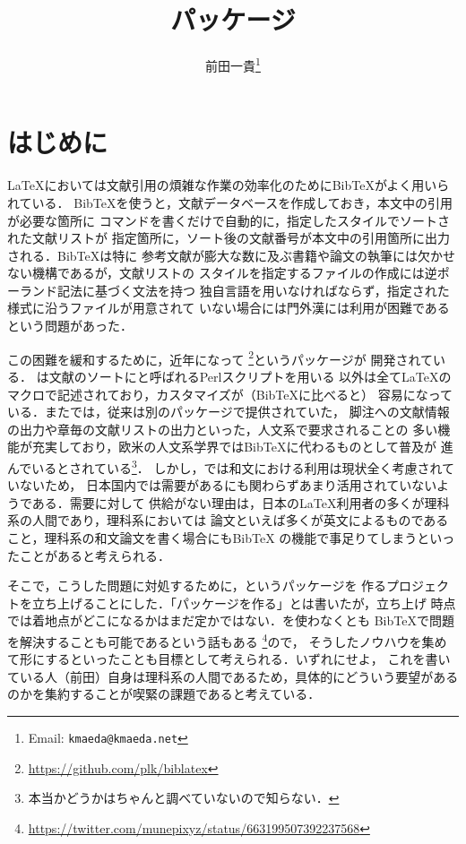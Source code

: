 \documentclass[lualatex,ja=standard,magstyle=real]{bxjsarticle}
\title{\bfseries\spotcolor\sty{biblatex-japanese}パッケージ}
\author{前田一貴\footnote{Email: \texttt{kmaeda@kmaeda.net}}}
\begin{document}
\maketitle

\tableofcontents

\section{はじめに}
\LaTeX においては文献引用の煩雑な作業の効率化のためにBib\TeX がよく用いられている．
Bib\TeX を使うと，文献データベースを作成しておき，本文中の引用が必要な箇所に
コマンドを書くだけで自動的に，指定したスタイルでソートされた文献リストが
指定箇所に，ソート後の文献番号が本文中の引用箇所に出力される．Bib\TeX は特に
参考文献が膨大な数に及ぶ書籍や論文の執筆には欠かせない機構であるが，文献リストの
スタイルを指定するファイルの作成には逆ポーランド記法に基づく文法を持つ
独自言語を用いなければならず，指定された様式に沿うファイルが用意されて
いない場合には門外漢には利用が困難であるという問題があった．

この困難を緩和するために，近年になって
\footnote{\url{https://github.com/plk/biblatex}}というパッケージが
開発されている．
は文献のソートにと呼ばれるPerlスクリプトを用いる
以外は全て\LaTeX{}のマクロで記述されており，カスタマイズが（Bib\TeX に比べると）
容易になっている．またでは，従来は別のパッケージで提供されていた，
脚注への文献情報の出力や章毎の文献リストの出力といった，人文系で要求されることの
多い機能が充実しており，欧米の人文系学界ではBib\TeX に代わるものとして普及が
進んでいるとされている\footnote{本当かどうかはちゃんと調べていないので知らない．}．
しかし，では和文における利用は現状全く考慮されていないため，
日本国内では需要があるにも関わらずあまり活用されていないようである．需要に対して
供給がない理由は，日本の\LaTeX 利用者の多くが理科系の人間であり，理科系においては
論文といえば多くが英文によるものであること，理科系の和文論文を書く場合にもBib\TeX
の機能で事足りてしまうといったことがあると考えられる．

そこで，こうした問題に対処するために，というパッケージを
作るプロジェクトを立ち上げることにした．「パッケージを作る」とは書いたが，立ち上げ
時点では着地点がどこになるかはまだ定かではない．を使わなくとも
Bib\TeX で問題を解決することも可能であるという話もある
\footnote{\url{https://twitter.com/munepixyz/status/663199507392237568}}ので，
そうしたノウハウを集めて形にするといったことも目標として考えられる．いずれにせよ，
これを書いている人（前田）自身は理科系の人間であるため，具体的にどういう要望がある
のかを集約することが喫緊の課題であると考えている．
\end{document}
